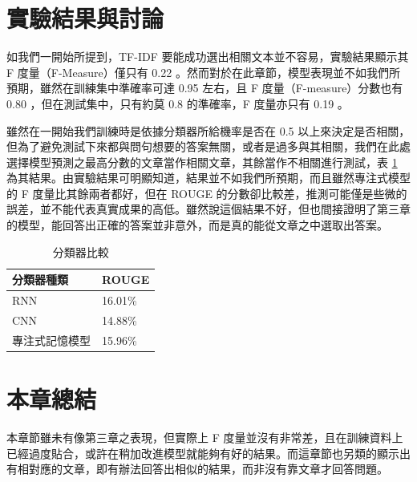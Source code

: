 \section{實驗結果與討論}
如我們一開始所提到，TF-IDF 要能成功選出相關文本並不容易，實驗結果顯示其 F 度量（F-Measure）僅只有 0.22 。然而對於在此章節，模型表現並不如我們所預期，雖然在訓練集中準確率可達 0.95 左右，且 F 度量（F-measure）分數也有 0.80 ，但在測試集中，只有約莫 0.8 的準確率，F 度量亦只有 0.19 。

雖然在一開始我們訓練時是依據分類器所給機率是否在 0.5 以上來決定是否相關，但為了避免測試下來都與問句想要的答案無關，或者是過多與其相關，我們在此處選擇模型預測之最高分數的文章當作相關文章，其餘當作不相關進行測試，表 \ref{table:classifier} 為其結果。由實驗結果可明顯知道，結果並不如我們所預期，而且雖然專注式模型的 F 度量比其餘兩者都好，但在 ROUGE 的分數卻比較差，推測可能僅是些微的誤差，並不能代表真實成果的高低。雖然說這個結果不好，但也間接證明了第三章的模型，能回答出正確的答案並非意外，而是真的能從文章之中選取出答案。
\begin{table}[ht]
    \caption{分類器比較} 
    \label{table:classifier}
    \centering
    \begin{tabular}{|l|l|}
        \hline
        分類器種類 & ROUGE\\
        \hline
        RNN & 16.01\%\\%
        \hline
        CNN & 14.88\%\\%
        \hline
        專注式記憶模型 & 15.96\%\\%
        \hline
    \end{tabular}
\end{table}
\section{本章總結}
本章節雖未有像第三章之表現，但實際上 F 度量並沒有非常差，且在訓練資料上已經過度貼合，或許在稍加改進模型就能夠有好的結果。而這章節也另類的顯示出有相對應的文章，即有辦法回答出相似的結果，而非沒有靠文章才回答問題。
